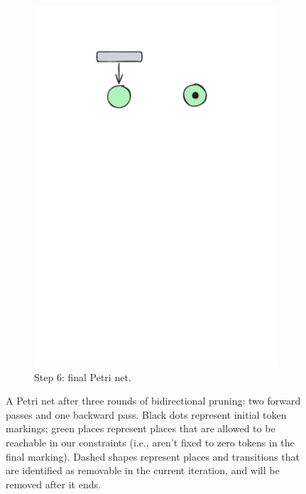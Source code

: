 \begin{figure}[H]
\begin{subfigure}[b][\subfigheight][b]{0.23\textwidth}
		\includegraphics[width=\textwidth]{plots/bidirectional_pruning_step_e_updated_2.pdf}
		\caption{Step 6: final Petri net.}
		\label{fig:step:e}
	\end{subfigure}
	
	\caption{A Petri net after three rounds of bidirectional pruning: two forward passes and one backward pass. Black dots represent initial token markings; green places represent places that are allowed to be reachable in our constraints (i.e., aren't fixed to zero tokens in the final marking). Dashed shapes represent places and transitions that are identified as removable in the current iteration, and will be removed after it ends.}
	\label{fig:bidirectional_pruning}
\end{figure}

